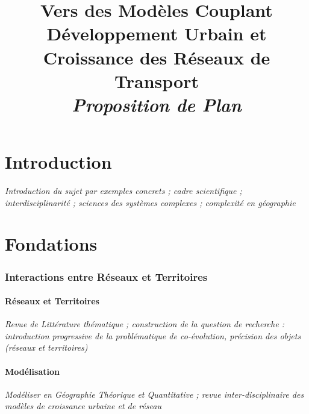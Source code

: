 




\title{Vers des Modèles Couplant Développement Urbain et Croissance des Réseaux de Transport\bigskip\\
\textit{Proposition de Plan}
}
\author{}


\maketitle

\justify


\begin{abstract}
\end{abstract}


\part*{Introduction}

\textit{Introduction du sujet par exemples concrets ; cadre scientifique ; interdisciplinarité ; sciences des systèmes complexes ; complexité en géographie}

\part{Fondations}


\section{Interactions entre Réseaux et Territoires}

\subsection{Réseaux et Territoires}

\textit{Revue de Littérature thématique ; construction de la question de recherche : introduction progressive de la problématique de co-évolution, précision des objets (réseaux et territoires)}

\subsection{Modélisation}

\textit{Modéliser en Géographie Théorique et Quantitative ; revue inter-disciplinaire des modèles de croissance urbaine et de réseau}


